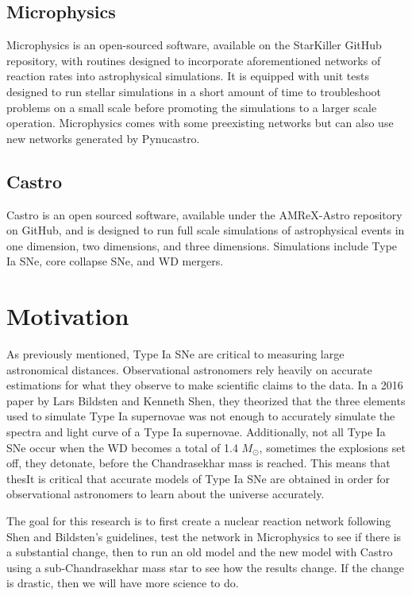 \documentclass[11pt, oneside]{article}   	%
\begin{document}
  \subsection{Microphysics}
  
    Microphysics is an open-sourced software, available on the StarKiller GitHub repository, with routines designed to incorporate aforementioned networks of reaction rates into astrophysical simulations. %
    It is equipped with unit tests designed to run stellar simulations in a short amount of time to troubleshoot problems on a small scale before promoting the simulations to a larger scale operation. Microphysics comes with some preexisting networks but can also use new networks generated by Pynucastro. 
  
  \subsection{Castro}
  
    Castro is an open sourced software, available under the AMReX-Astro repository on GitHub, and is designed to run full scale simulations of astrophysical events in one dimension, two dimensions, and three dimensions. Simulations include Type Ia SNe, core collapse SNe, and WD mergers. 
  
\section{Motivation}
  
  As previously mentioned, Type Ia SNe are critical to measuring large astronomical distances. Observational astronomers rely heavily on accurate estimations for what they observe to make scientific claims to the data. In a 2016 paper by Lars Bildsten and Kenneth Shen, they theorized that the three elements used to simulate Type Ia supernovae was not enough to accurately simulate the spectra and light curve of a Type Ia supernovae. %
  Additionally, not all Type Ia SNe occur when the WD becomes a total of 1.4 $M_{\odot}$, sometimes the explosions set off, they detonate, before the Chandrasekhar mass is reached. This means that thesIt is critical that accurate models of Type Ia SNe are obtained in order for observational astronomers to learn about the universe accurately. 
  
  The goal for this research is to first create a nuclear reaction network following Shen and Bildsten's guidelines, test the network in Microphysics to see if there is a substantial change, then to run an old model and the new model with Castro using a sub-Chandrasekhar mass star to see how the results change. If the change is drastic, then we will have more science to do. 
  
\end{document}
